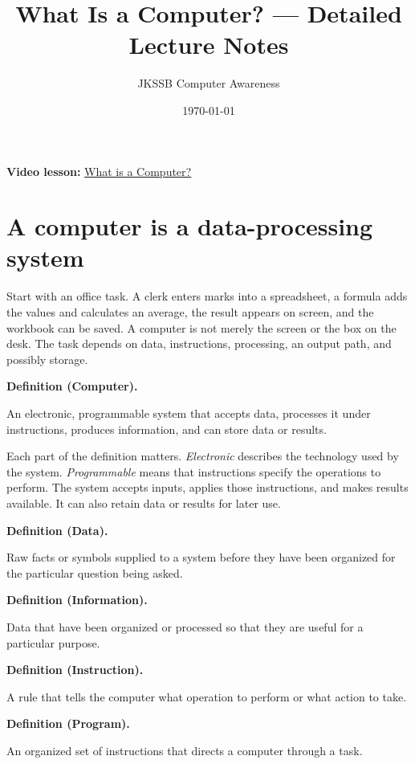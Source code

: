 \documentclass[11pt]{article}
\title{What Is a Computer? --- Detailed Lecture Notes}
\author{JKSSB Computer Awareness}
\date{\today}
\newenvironment{definitionbox}[1]{%
  \par\noindent\textbf{Definition (#1).}\ \itshape
}{\par\vspace{0.3em}}
\begin{document}
\maketitle
\noindent\textbf{Video lesson:}
\href{https://youtu.be/EdRZK57oqpo}{What is a Computer?}

\section{A computer is a data-processing system}
Start with an office task. A clerk enters marks into a spreadsheet, a formula
adds the values and calculates an average, the result appears on screen, and
the workbook can be saved. A computer is not merely the screen or the box on
the desk. The task depends on data, instructions, processing, an output path,
and possibly storage.

\begin{definitionbox}{Computer}
An electronic, programmable system that accepts data, processes it under
instructions, produces information, and can store data or results.
\end{definitionbox}

Each part of the definition matters. \emph{Electronic} describes the
technology used by the system. \emph{Programmable} means that instructions
specify the operations to perform. The system accepts inputs, applies those
instructions, and makes results available. It can also retain data or results
for later use.

\begin{definitionbox}{Data}
Raw facts or symbols supplied to a system before they have been organized for
the particular question being asked.
\end{definitionbox}

\begin{definitionbox}{Information}
Data that have been organized or processed so that they are useful for a
particular purpose.
\end{definitionbox}

\begin{definitionbox}{Instruction}
A rule that tells the computer what operation to perform or what action to
take.
\end{definitionbox}

\begin{definitionbox}{Program}
An organized set of instructions that directs a computer through a task.
\end{definitionbox}
\end{document}
